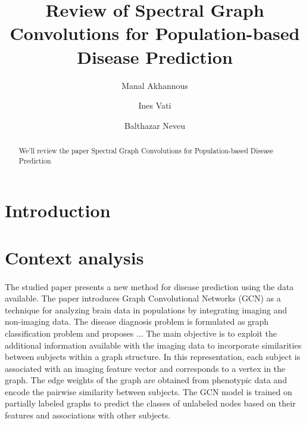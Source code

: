 \documentclass[sigconf]{acmart}
\begin{document}
\title{Review of Spectral Graph Convolutions for Population-based Disease Prediction}

\author{Manal Akhannous}

\author{Ines Vati}

\author{Balthazar Neveu}


\renewcommand{\shortauthors}{MVA et al.}

\begin{abstract}
  We'll review the paper Spectral Graph Convolutions for Population-based Disease Prediction \cite{Parisot17}
\end{abstract}





\maketitle

\section{Introduction}


\cite{Parisot17}
\section{Context analysis}

\paragraph{} The studied paper presents a new method for disease prediction using the data available. The paper introduces Graph Convolutional Networks (GCN) as a technique for analyzing brain data in populations by integrating imaging and non-imaging data. The disease diagnosis problem is formulated as graph classification problem and proposes ...
The main objective is to exploit the additional information available with the imaging data to incorporate similarities between subjects within a graph structure. In this representation, each subject is associated with an imaging feature vector and corresponds to a vertex in the graph. The edge weights of the graph are obtained from phenotypic data and encode the pairwise similarity between subjects. The GCN model is trained on partially labeled graphs to predict the classes of unlabeled nodes based on their features and associations with other subjects.
\end{document}
